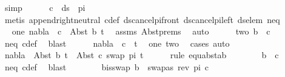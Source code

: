\begin{isabellebody}
\ simp\isanewline
\ \ \ \ \isamarkupfalse%
\ {\isachardoublequoteopen}c\ {\isasymin}\ ds\ {\isacharbrackleft}{\kern0pt}{\isacharbrackright}{\kern0pt}\ pi{\isachardoublequoteclose}\isanewline
\ \ \ \ \ \ \isamarkupfalse%
\ {\isacharparenleft}{\kern0pt}metis\ append{\isachardot}{\kern0pt}right{\isacharunderscore}{\kern0pt}neutral\ c{\isacharunderscore}{\kern0pt}def\ ds{\isacharunderscore}{\kern0pt}cancel{\isacharunderscore}{\kern0pt}pi{\isacharunderscore}{\kern0pt}front\ ds{\isacharunderscore}{\kern0pt}cancel{\isacharunderscore}{\kern0pt}pi{\isacharunderscore}{\kern0pt}left\ ds{\isacharunderscore}{\kern0pt}elem\ neq{\isacharparenright}{\kern0pt}\isanewline
\ \ \ \ \isamarkupfalse%
\ \isamarkupfalse%
\ one{\isacharcolon}{\kern0pt}\ {\isachardoublequoteopen}nabla\ {\isasymturnstile}\ c\ {\isasymsharp}\ Abst\ b\ t{\isacharprime}{\kern0pt}{\isachardoublequoteclose}\ \isamarkupfalse%
\ assms\ Abst{\isachardot}{\kern0pt}prems\ \isamarkupfalse%
\ auto\isanewline
\ \ \ \ \isamarkupfalse%
\ two{\isacharcolon}{\kern0pt}\ {\isachardoublequoteopen}b\ {\isasymnoteq}\ c{\isachardoublequoteclose}\ \isamarkupfalse%
\ neq\ c{\isacharunderscore}{\kern0pt}def\ \isamarkupfalse%
\ blast\isanewline
\ \ \ \ \isamarkupfalse%
\ {\isachardoublequoteopen}nabla\ {\isasymturnstile}\ c\ {\isasymsharp}\ t{\isacharprime}{\kern0pt}{\isachardoublequoteclose}\ \isamarkupfalse%
\ one\ two\ \isamarkupfalse%
\ cases\ auto\isanewline
\ \ \ \ \isamarkupfalse%
\ {\isachardoublequoteopen}nabla\ {\isasymturnstile}\ Abst\ b\ t{\isacharprime}{\kern0pt}\ {\isasymapprox}\ Abst\ c\ {\isacharparenleft}{\kern0pt}swap\ pi\ t{\isacharprime}{\kern0pt}{\isacharparenright}{\kern0pt}{\isachardoublequoteclose}\ \isanewline
\ \ \ \ \isamarkupfalse%
{\isacharparenleft}{\kern0pt}rule\ equ{\isacharunderscore}{\kern0pt}abst{\isacharunderscore}{\kern0pt}ab{\isacharparenright}{\kern0pt}\isanewline
\ \ \ \ \ \ \isamarkupfalse%
\ {\isachardoublequoteopen}b\ {\isasymnoteq}\ c{\isachardoublequoteclose}\ \isamarkupfalse%
\ neq\ c{\isacharunderscore}{\kern0pt}def\ \isamarkupfalse%
\ blast\isanewline
\ \ \ \ \ \ \isamarkupfalse%
\ b{\isacharunderscore}{\kern0pt}is{\isacharunderscore}{\kern0pt}swap{\isacharcolon}{\kern0pt}\ {\isachardoublequoteopen}b\ {\isacharequal}{\kern0pt}\ swapas\ {\isacharparenleft}{\kern0pt}rev\ pi{\isacharparenright}{\kern0pt}\ c{\isachardoublequoteclose}\ \isamarkupfalse%

\end{isabellebody}
